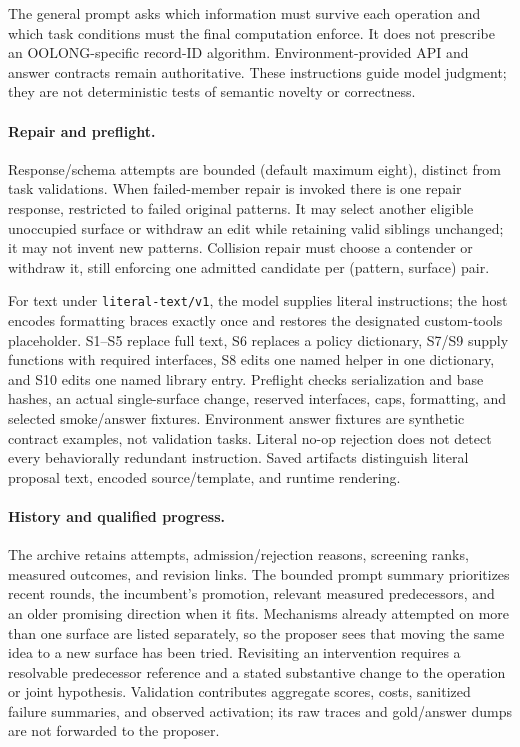 The general prompt asks which information must survive each operation and which
task conditions must the final computation enforce. It does not prescribe an
OOLONG-specific record-ID algorithm. Environment-provided API and answer
contracts remain authoritative. These instructions guide model judgment; they
are not deterministic tests of semantic novelty or correctness.

\paragraph{Repair and preflight.}
Response/schema attempts are bounded (default maximum eight), distinct from
task validations. When failed-member repair is invoked there is one repair
response, restricted to failed original patterns. It may select another eligible
unoccupied surface or withdraw an edit while retaining valid siblings unchanged;
it may not invent new patterns. Collision repair must choose a contender or
withdraw it, still enforcing one admitted candidate per (pattern, surface) pair.

For text under \texttt{literal-text/v1}, the model supplies literal instructions;
the host encodes formatting braces exactly once and restores the designated
custom-tools placeholder. S1--S5 replace full text, S6 replaces a policy
dictionary, S7/S9 supply functions with required interfaces, S8 edits one named
helper in one dictionary, and S10 edits one named library entry. Preflight checks
serialization and base hashes, an actual single-surface change, reserved
interfaces, caps, formatting, and selected smoke/answer fixtures. Environment
answer fixtures are synthetic contract examples, not validation tasks. Literal
no-op rejection does not detect every behaviorally redundant instruction.
Saved artifacts distinguish literal proposal text, encoded source/template, and
runtime rendering.

\paragraph{History and qualified progress.}
The archive retains attempts, admission/rejection reasons, screening ranks,
measured outcomes, and revision links. The bounded prompt summary prioritizes
recent rounds, the incumbent's promotion, relevant measured predecessors, and an
older promising direction when it fits. Mechanisms already attempted on more
than one surface are listed separately, so the proposer sees that moving the
same idea to a new surface has been tried. Revisiting an intervention requires a
resolvable predecessor reference and a stated substantive change to the operation
or joint hypothesis. Validation contributes aggregate scores, costs, sanitized
failure summaries, and observed activation; its raw traces and gold/answer dumps
are not forwarded to the proposer.

